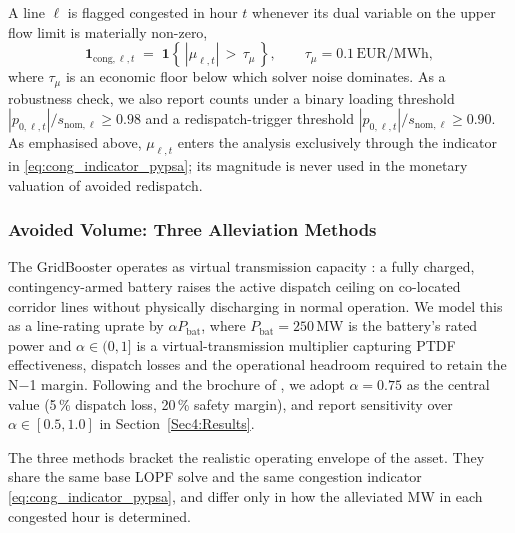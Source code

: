 A line $\ell$ is flagged congested in hour $t$ whenever its dual variable on the upper flow limit is materially non-zero,
\begin{equation}
    \mathbf{1}_{\mathrm{cong},\ell,t}
    \;=\;
    \mathbf{1}\!\left\{\, |\mu_{\ell,t}| \,>\, \tau_\mu \,\right\},
    \qquad \tau_\mu = 0.1\,\mathrm{EUR/MWh},
    \label{eq:cong_indicator_pypsa}
\end{equation}
where $\tau_\mu$ is an economic floor below which solver noise dominates. As a robustness check, we also report counts under a binary loading threshold $|p_{0,\ell,t}|/s_{\mathrm{nom},\ell} \geq 0.98$ and a redispatch-trigger threshold $|p_{0,\ell,t}|/s_{\mathrm{nom},\ell} \geq 0.90$. As emphasised above, $\mu_{\ell,t}$ enters the analysis exclusively through the indicator in \eqref{eq:cong_indicator_pypsa}; its magnitude is never used in the monetary valuation of avoided redispatch.
 
\subsubsection{Avoided Volume: Three Alleviation Methods}\label{Subsubsec3:Alleviation_methods}
 
The GridBooster operates as virtual transmission capacity \citep{Fluence_2020_Virtual_Transmission_Whitepaper, Bauknecht_2024_Role_of_Decentralized_Flexibility_Options}: a fully charged, contingency-armed battery raises the active dispatch ceiling on co-located corridor lines without physically discharging in normal operation. We model this as a line-rating uprate by $\alpha P_{\mathrm{bat}}$, where $P_{\mathrm{bat}} = 250$\,MW is the battery's rated power and $\alpha \in (0,1]$ is a virtual-transmission multiplier capturing PTDF effectiveness, dispatch losses and the operational headroom required to retain the N$-$1 margin. Following \citet{Consentec_Fluence_2025_GridBooster_Monetary_Valuation} and the brochure of \citet{TransnetBW_2024_Netzbooster_Brochure}, we adopt $\alpha = 0.75$ as the central value (5\,\% dispatch loss, 20\,\% safety margin), and report sensitivity over $\alpha \in [0.5, 1.0]$ in Section~\ref{Sec4:Results}.
 
The three methods bracket the realistic operating envelope of the asset. They share the same base LOPF solve and the same congestion indicator \eqref{eq:cong_indicator_pypsa}, and differ only in how the alleviated MW in each congested hour is determined.
 
